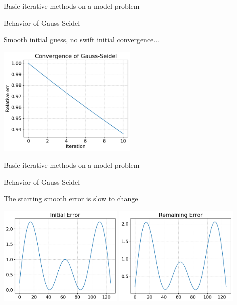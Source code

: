 \documentclass[18pt,xcolor=table]{beamer}
\begin{document}
\begin{frame}{Basic iterative methods on a model problem}
\begin{block}{Behavior of Gauss-Seidel}
\bit
\item Smooth initial guess, no swift initial convergence...
\eit
\end{block}
\begin{center}
\includegraphics[width=0.5\textwidth]{../figures/gaussSeidelConvSmooth}
\end{center}
\end{frame}

\begin{frame}{Basic iterative methods on a model problem}
\begin{block}{Behavior of Gauss-Seidel}
\bit
\item The starting smooth error is slow to change
\eit
\end{block}
\begin{center}
\includegraphics[width=0.45\textwidth]{../figures/gaussSeidelInitialErrSmooth}
\includegraphics[width=0.45\textwidth]{../figures/gaussSeidelRemainingErrSmooth}
\end{center}
\end{frame}
\end{document}
